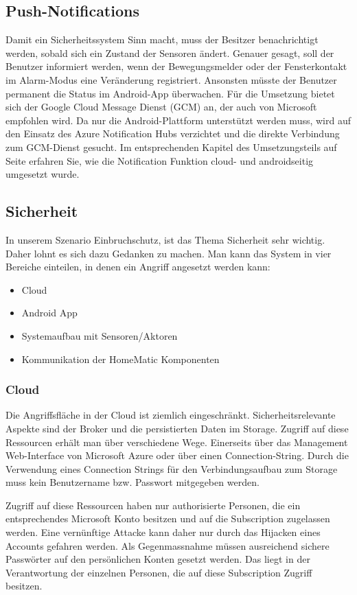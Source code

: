 \subsection{Push-Notifications}
Damit ein Sicherheitssystem Sinn macht, muss der Besitzer benachrichtigt werden, sobald sich ein Zustand der Sensoren ändert. Genauer gesagt, soll der Benutzer informiert werden, wenn der Bewegungsmelder oder der Fensterkontakt im Alarm-Modus eine Veränderung registriert. Ansonsten müsste der Benutzer permanent die Status im Android-App überwachen. Für die Umsetzung bietet sich der Google Cloud Message Dienst (GCM) an, der auch von Microsoft empfohlen wird. Da nur die Android-Plattform unterstützt werden muss, wird auf den Einsatz des Azure Notification Hubs verzichtet und die direkte Verbindung zum GCM-Dienst gesucht. Im entsprechenden Kapitel des Umsetzungsteils auf Seite \pageref{sec:notificationRealization} erfahren Sie, wie die Notification Funktion cloud- und androidseitig umgesetzt wurde.

\subsection{Sicherheit}
In unserem Szenario Einbruchschutz, ist das Thema Sicherheit sehr wichtig. Daher lohnt es sich dazu  Gedanken zu machen. Man kann das System in vier Bereiche einteilen, in denen ein Angriff angesetzt werden kann:
\begin{itemize}
	\item Cloud
	\item Android App
	\item Systemaufbau mit Sensoren/Aktoren
	\item Kommunikation der HomeMatic Komponenten
\end{itemize}

\subsubsection{Cloud}
Die Angriffsfläche in der Cloud ist ziemlich eingeschränkt. Sicherheitsrelevante Aspekte sind der Broker und die persistierten Daten im Storage. Zugriff auf diese Ressourcen erhält man über verschiedene Wege. Einerseits über das Management Web-Interface von Microsoft Azure oder über einen Connection-String. Durch die Verwendung eines Connection Strings für den Verbindungsaufbau zum Storage muss kein Benutzername bzw. Passwort mitgegeben werden.

Zugriff auf diese Ressourcen haben nur authorisierte Personen, die ein entsprechendes Microsoft Konto besitzen und auf die Subscription zugelassen werden. Eine vernünftige Attacke kann daher nur durch das Hijacken eines Accounts gefahren werden. Als Gegenmassnahme müssen ausreichend sichere Passwörter auf den persönlichen Konten gesetzt werden. Das liegt in der Verantwortung der einzelnen Personen, die auf diese Subscription Zugriff besitzen.

